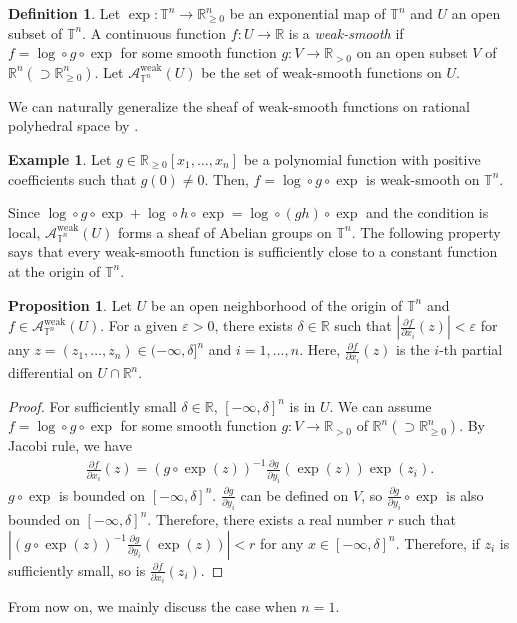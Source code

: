\documentclass[a4paper,dvipdfmx,reqno,12pt]{amsart}
\theoremstyle{definition}
\newtheorem{definition}[theorem]{Definition}
\newtheorem{example}[theorem]{Example}
\newtheorem{proposition}[theorem]{Proposition}
\newcommand{\vep}{\varepsilon}%
\newcommand{\opn}[1]{\operatorname{#1}}
\numberwithin{equation}{section}
\begin{document}
\begin{definition} \label{definition-weak-smooth}
Let $\opn{exp}\colon \mathbb{T}^{n}\to 
\mathbb{R}_{\geq 0}^{n}$ be an exponential map of 
$\mathbb{T}^{n}$ and $U$ an open subset of 
$\mathbb{T}^{n}$.
A continuous function $f\colon U\to \mathbb{R}$
is a \emph{weak-smooth} if 
$f=\opn{log}\circ g\circ \opn{exp}$ for some 
smooth function $g\colon V\to \mathbb{R}_{>0}$ on 
an open subset $V$ of $\mathbb{R}^{n} 
(\supset \mathbb{R}_{\geq 0}^{n})$.
Let $\mathcal{A}_{\mathbb{T}^{n}}^{\mathrm{weak}}(U)$ 
be the set of weak-smooth functions on $U$.
\end{definition}
We can naturally generalize the sheaf of weak-smooth functions 
on rational polyhedral space by 
\cite[Lemma 9]{itenbergTropicalHomology2019b}.
\begin{example}
Let 
$g\in \mathbb{R}_{\geq 0}[x_1,\ldots,x_n]$ be a polynomial 
function with positive coefficients such that $g(0)\ne 0$. 
Then, $f=\opn{log}\circ g \circ \opn{exp}$ is weak-smooth 
on $\mathbb{T}^{n}$.
\end{example}

Since $\opn{log}\circ g\circ\opn{exp}+\opn{log}\circ h
\circ \opn{exp}=\opn{log}\circ(gh)\circ\opn{exp}$ and 
the condition is local, 
$\mathcal{A}_{\mathbb{T}^{n}}^{\opn{weak}}(U)$ forms a 
sheaf of Abelian groups on $\mathbb{T}^{n}$. 
The following property says that every weak-smooth 
function is sufficiently close to a constant function 
at the origin of $\mathbb{T}^{n}$.
\begin{proposition}
Let $U$ be an open neighborhood of the origin of 
$\mathbb{T}^{n}$ and 
 $f\in \mathcal{A}_{\mathbb{T}^{n}}^{\mathrm{weak}}(U)$.
For a given $\vep >0$, there exists $\delta\in \mathbb{R}$
such that $|\frac{\partial f}{\partial x_i}(z)|<\vep$
for any $z=(z_1,\ldots,z_n) \in (-\infty,\delta]^{n}$ and $i=1,\ldots,n$. 
Here, $\frac{\partial f}{\partial x_i}(z)$ is the $i$-th partial 
differential on $U\cap \mathbb{R}^{n}$.
\end{proposition}
\begin{proof}
For sufficiently small $\delta\in \mathbb{R}$, 
$[-\infty,\delta]^{n}$ is in $U$. 
We can assume $f=\opn{log}\circ g\circ \opn{exp}$ for
some smooth function 
$g\colon V\to \mathbb{R}_{>0}$ of $\mathbb{R}^{n} 
(\supset \mathbb{R}_{\geq 0}^{n})$.
By Jacobi rule, we have
\begin{align}
\frac{\partial f}{\partial x_i}(z)=(g\circ \opn{exp}(z))^{-1} 
\frac{\partial g}{\partial y_i}(\opn{exp}(z))\opn{exp}(z_i).
\end{align}
$g\circ \opn{exp}$ is bounded on $[-\infty,\delta]^{n}$.
$\frac{\partial g}{\partial y_i}$ can be defined 
on $V$, so $\frac{\partial g}{\partial y_i}\circ \opn{exp}$
is also bounded on $[-\infty,\delta]^{n}$.
Therefore, there exists a real number $r$ such that
$|(g\circ \opn{exp}(z))^{-1} 
\frac{\partial g}{\partial y_i}(\opn{exp}(z))|<r$ for any 
$x\in [-\infty,\delta]^{n}$.
Therefore, if $z_i$ is sufficiently small, so is 
$\frac{\partial f}{\partial x_i}(z_i)$. 
\end{proof}
From now on, we mainly discuss the case when $n=1$.
\end{document}
